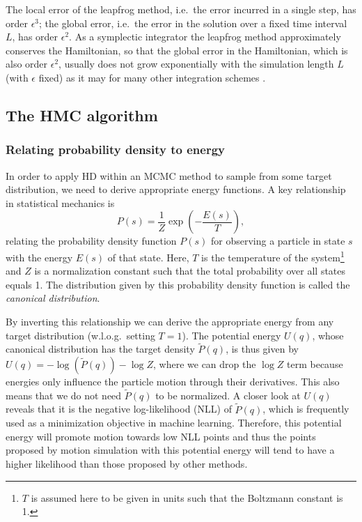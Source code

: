 The local error of the leapfrog method, i.e.\ the error incurred in a single step, has order $\epsilon^3$; the global error, i.e.\ the error in the solution over a fixed time interval $L$, has order $\epsilon^2$. As a symplectic integrator the leapfrog method approximately conserves the Hamiltonian, so that the global error in the Hamiltonian, which is also order $\epsilon^2$, usually does not grow exponentially with the simulation length $L$ (with $\epsilon$ fixed) as it may for many other integration schemes \parencite{Neal2011}.

\subsection{The HMC algorithm}
\label{sec:HMCAlgorithmSection}
\subsubsection{Relating probability density to energy}
In order to apply HD within an MCMC method to sample from some target distribution, we need to derive appropriate energy functions. A key relationship in statistical mechanics is
\begin{equation}
P(s) = \frac{1}{Z} \exp \left(- \frac{E(s)}{T} \right),
\end{equation}
relating the probability density function $P(s)$ for observing a particle in state $s$ with the energy $E(s)$ of that state. Here, $T$ is the temperature of the system\footnote{$T$ is assumed here to be given in units such that the Boltzmann constant is 1.} and $Z$ is a normalization constant such that the total probability over all states equals 1. The distribution given by this probability density function is called the \textit{canonical distribution}.

By inverting this relationship we can derive the appropriate energy from any target distribution (w.l.o.g.\ setting $T=1$). The potential energy $U(q)$, whose canonical distribution has the target density $\tilde{P}(q)$, is thus given by $U(q) = -\log \left( \tilde{P}(q) \right) - \log Z$,
where we can drop the $\log Z$ term because energies only influence the particle motion through their derivatives. This also means that we do not need $\tilde{P}(q)$ to be normalized. A closer look at $U(q)$ reveals that it is the negative log-likelihood (NLL) of $\tilde{P}(q)$, which is frequently used as a minimization objective in machine learning. Therefore, this potential energy will promote motion towards low NLL points and thus the points proposed by motion simulation with this potential energy will tend to have a higher likelihood than those proposed by other methods.

